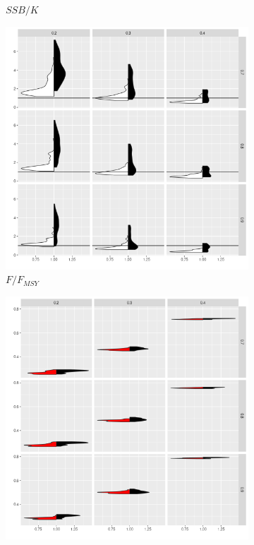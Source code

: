 \begin{figure}[!ht]
\begin{subfigure}{0.32\textwidth}
		\caption{$SSB/K$}
		\label{fig:grid-blim}
	\end{subfigure}
	\begin{subfigure}{0.32\textwidth}  
		\centering 
		\includegraphics[width=\textwidth]{figures/v-h-1.png}
		\caption{$F/F_{MSY}$}
		\label{fig:grid-fmsy}
	\end{subfigure}
	\begin{subfigure}{0.32\textwidth}  
		\centering 
		\includegraphics[width=\textwidth]{figures/v-r-1.png}

\end{subfigure}
\end{figure}
